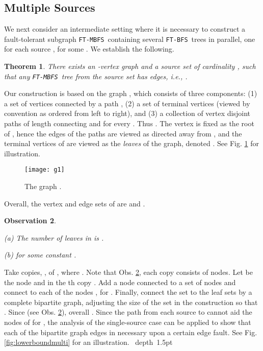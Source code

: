 \documentclass[12pt]{article}
\newtheorem{theorem}{Theorem}[section]
\newtheorem{observation}[theorem]{Observation}
\def\Proof{\par\noindent{\bf Proof:~}}
\def\blackslug{\hbox{\hskip 1pt \vrule width 4pt height 8pt
    depth 1.5pt \hskip 1pt}}
\def\QED{\quad\blackslug\lower 8.5pt\null\par}
\def\FTMBFS{\mbox{\tt FT-MBFS}}
\def\FTBFS{\mbox{\tt FT-BFS}}
\begin{document}
\subsection{Multiple Sources}
\label{sec:multiedge_lb}
We next consider an intermediate setting where it is necessary to construct
a fault-tolerant subgraph \FTMBFS\ containing several \FTBFS\ trees in parallel,
one for each source  , for some .
We establish the following.
\begin{theorem}
\label{thm:lowerbound_f_multisource}
There exists an -vertex graph  and a source set 
of cardinality , such that any \FTMBFS\ tree from
the source set  has  edges,
i.e., .
\end{theorem}
\Proof
Our construction is based on the graph ,
which consists of three components:
(1) a set of vertices  connected by a path
,
(2) a set of terminal vertices 
(viewed by convention as ordered from left to right),
and
(3) a collection of  vertex disjoint paths  of length
 connecting  and 
for every .
Thus .
The vertex  is fixed as the root of , hence
the edges of the paths  are viewed as directed away from ,
and the terminal vertices of  are viewed as the \emph{leaves} of the graph,
denoted .
See Fig. \ref{fig:lowerboundg1} for illustration.

\begin{figure}[h!]
\begin{center}
\texttt{[image: g1]}
\caption{\label{fig:lowerboundg1} The graph .}
\end{center}
\end{figure}

Overall, the vertex and edge sets of  are
 and
.

\begin{observation}
\label{obs:rel}
\begin{description}
\item{(a)}
The number of leaves in  is .
\item{(b)}
 for some constant .
\end{description}
\end{observation}

Take  copies, , of ,
where .
Note that Obs. \ref{obs:rel}, each copy  consists of 
nodes.
Let  be the node  and  in the th copy .
Add a node  connected to a set  of  nodes and connect 
to each of the nodes , for .
Finally, connect the set  to the  leaf sets
 by a complete bipartite graph,
adjusting the size of the set  in the construction so that .
Since  (see Obs. \ref{obs:rel}),
overall .
Since the path from each source  to  cannot aid the nodes of 
for , the analysis of the single-source case can be applied
to show that each of the bipartite graph edges in necessary
upon a certain edge fault.
See Fig. \ref{fig:lowerboundmulti} for an illustration.
\QED
\end{document}

